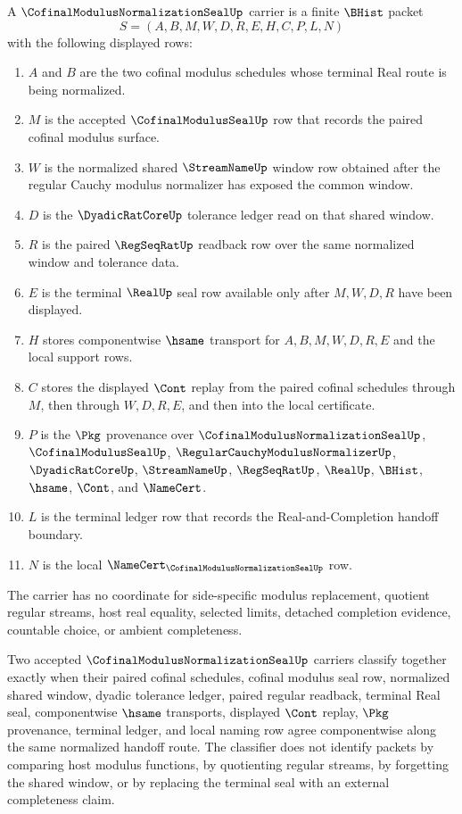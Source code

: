 \begin{definition}
\label{def:cofinal-modulus-normalization-seal-carrier}
A $\CofinalModulusNormalizationSealUp$ carrier is a finite $\BHist$ packet
$$
S=(A,B,M,W,D,R,E,H,C,P,L,N)
$$
with the following displayed rows:
\begin{enumerate}
\item $A$ and $B$ are the two cofinal modulus schedules whose terminal Real route is being normalized.
\item $M$ is the accepted $\CofinalModulusSealUp$ row that records the paired cofinal modulus surface.
\item $W$ is the normalized shared $\StreamNameUp$ window row obtained after the regular Cauchy modulus normalizer has exposed the common window.
\item $D$ is the $\DyadicRatCoreUp$ tolerance ledger read on that shared window.
\item $R$ is the paired $\RegSeqRatUp$ readback row over the same normalized window and tolerance data.
\item $E$ is the terminal $\RealUp$ seal row available only after $M,W,D,R$ have been displayed.
\item $H$ stores componentwise $\hsame$ transport for $A,B,M,W,D,R,E$ and the local support rows.
\item $C$ stores the displayed $\Cont$ replay from the paired cofinal schedules through $M$, then through $W,D,R,E$, and then into the local certificate.
\item $P$ is the $\Pkg$ provenance over $\CofinalModulusNormalizationSealUp$, $\CofinalModulusSealUp$, $\RegularCauchyModulusNormalizerUp$, $\DyadicRatCoreUp$, $\StreamNameUp$, $\RegSeqRatUp$, $\RealUp$, $\BHist$, $\hsame$, $\Cont$, and $\NameCert$.
\item $L$ is the terminal ledger row that records the Real-and-Completion handoff boundary.
\item $N$ is the local $\NameCert_{\CofinalModulusNormalizationSealUp}$ row.
\end{enumerate}
The carrier has no coordinate for side-specific modulus replacement, quotient regular streams, host real equality, selected limits, detached completion evidence, countable choice, or ambient completeness.
\end{definition}

\begin{definition}
\label{def:cofinal-modulus-normalization-seal-classifier}
Two accepted $\CofinalModulusNormalizationSealUp$ carriers classify together exactly when their paired cofinal schedules, cofinal modulus seal row, normalized shared window, dyadic tolerance ledger, paired regular readback, terminal Real seal, componentwise $\hsame$ transports, displayed $\Cont$ replay, $\Pkg$ provenance, terminal ledger, and local naming row agree componentwise along the same normalized handoff route. The classifier does not identify packets by comparing host modulus functions, by quotienting regular streams, by forgetting the shared window, or by replacing the terminal seal with an external completeness claim.
\end{definition}

